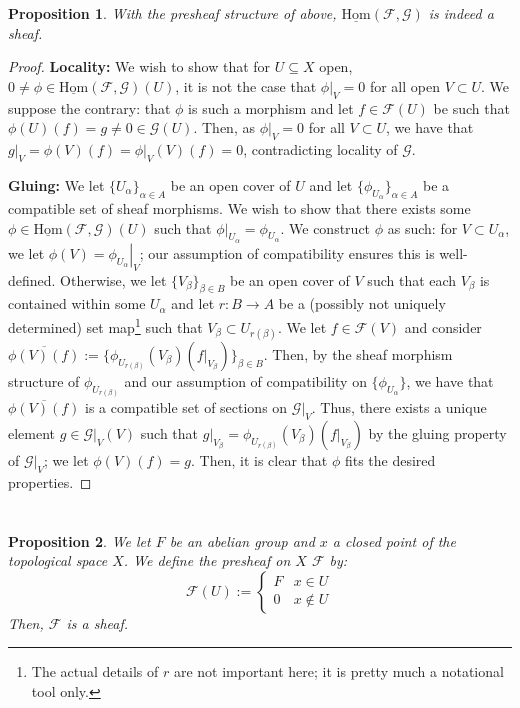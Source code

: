 \documentclass[english]{article}
\newcommand{\evat}[3]{\left. #1\right|_{#2}^{#3}}
\newcommand{\FF}{\mathscr{F}}
\newcommand{\GG}{\mathscr{G}}
\newcommand{\prob}[1]{\setcounter{section}{#1-1}\section{}}
\newcommand{\prt}[1]{\setcounter{subsection}{#1-1}\subsection{}}
\newtheorem*{proposition*}{Proposition}
\theoremstyle{remark}
\theoremstyle{definition}
\renewcommand{\bar}{\overline}
\renewcommand{\hom}{\mathrm{Hom}}
\newcommand{\restr}[2]{\evat{#1}{#2}{}}
\newcommand{\imp}[1]{\underline{#1}}
\newcommand{\ihm}{\imp{\hom}}
\newcommand{\him}{\ihm(\FF,\GG)}
\begin{document}
\begin{proposition*}
	With the presheaf structure of above, $\ihm(\FF,\GG)$ is indeed a sheaf.
\end{proposition*}\begin{proof}
\textbf{Locality:} We wish to show that for $U\subseteq X$ open, $0\neq\phi\in\him(U)$, it is not the case that $\restr{\phi}{V}=0$ for all open $V\subset U$. We suppose the contrary: that $\phi$ is such a morphism and let $f\in \FF(U)$ be such that $\phi(U)(f)=g\neq 0\in \GG(U)$. Then, as $\restr{\phi}{V}=0$ for all $V\subset U$, we have that $\restr{g}{V}=\phi(V)(f)=\restr{\phi}{V}(V)(f)=0$, contradicting locality of $\GG$.

\textbf{Gluing:} We let $\{U_\alpha\}_{\alpha\in A}$ be an open cover of $U$ and let $\{\phi_{U_\alpha}\}_{\alpha\in A}$ be a compatible set of sheaf morphisms. We wish to show that there exists some $\phi\in\him(U)$ such that $\restr{\phi}{U_\alpha}=\phi_{U_{\alpha}}$. We construct $\phi$ as such: for $V\subset U_\alpha$, we let $\phi(V)=\restr{\phi_{U_\alpha}}{V}$; our assumption of compatibility ensures this is well-defined. Otherwise, we let $\{V_{\beta}\}_{\beta\in B}$ be an open cover of $V$ such that each $V_\beta$ is contained within some $U_\alpha$ and let $r:B\to A$ be a (possibly not uniquely determined) set map\footnote{The actual details of $r$ are not important here; it is pretty much a notational tool only.} such that $V_{\beta}\subset U_{r(\beta)} $. We let $f\in \FF(V)$ and consider $\bar{\phi(V)(f)}:=\{\phi_{U_{r(\beta)}}(V_\beta)(\restr{f}{V_{\beta}})\}_{\beta\in B}$. Then, by the sheaf morphism structure of $\phi_{U_{r(\beta)}}$ and our assumption of compatibility on $\{\phi_{U_\alpha}\}$, we have that $\bar{\phi(V)(f)}$ is a compatible set of sections on $\restr{\GG}{V}$. Thus, there exists a unique element $g\in \restr{\GG}{V}(V)$ such that $\restr{g}{V_\beta}=\phi_{U_{r(\beta)}}(V_\beta)(\restr{f}{V_{\beta}})$ by the gluing property of $\restr{\GG}{V}$; we let $\phi(V)(f)=g$. Then, it is clear that $\phi$ fits the desired properties.
\end{proof}
\prob{5} \prt{1}
\begin{proposition*}
	We let $F$ be an abelian group and $x$ a closed point of the topological space $X$. We define the presheaf on $X$ $\FF$ by:\begin{equation}
		\FF(U):=\begin{cases}
		F&x\in U\\
		0&x\notin U
		\end{cases}
	\end{equation}
	Then, $\FF$ is a sheaf.
\end{proposition*}
\end{document}
